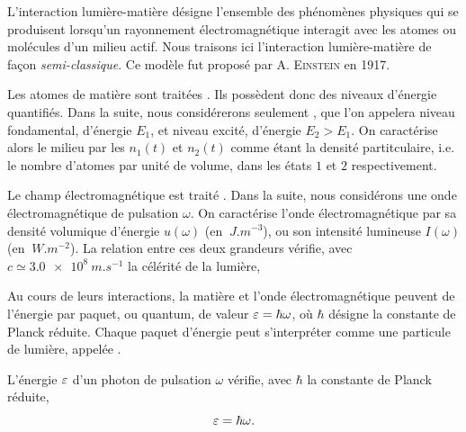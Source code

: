 \documentclass[12pt,fancy]{cours}
\begin{document}
L'interaction lumière-matière désigne l'ensemble des phénomènes physiques qui se produisent lorsqu'un rayonnement électromagnétique interagit avec les atomes ou molécules d'un milieu actif.
Nous traisons ici l'interaction lumière-matière de façon \emph{semi-classique}. Ce modèle fut proposé par A. \textsc{Einstein} en 1917.
\begin{hypotheses}
  \item Les atomes de matière sont traitées . Ils possèdent donc des niveaux d'énergie quantifiés. 
   Dans la suite, nous considérerons seulement , que l'on appelera niveau fondamental, d'énergie $E_1$, et niveau excité, d'énergie $E_2>E_1$. On caractérise alors le milieu par les  $n_1(t)$ et $n_2(t)$ comme étant la densité partitculaire, i.e. le nombre d'atomes par unité de volume, dans les états $1$ et $2$ respectivement. 
  
  \item Le champ électromagnétique est traité . Dans la suite, nous considérons une onde électromagnétique  de pulsation $\omega$. On caractérise l'onde électromagnétique par sa densité volumique d’énergie $u(\omega)$ (en $\SI{}{J.m^{-3}}$), ou son intensité lumineuse $I(\omega)$ (en $\SI{}{W.m^{-2}}$). La relation entre ces deux grandeurs vérifie, avec $c\simeq \SI{3.0e8}{m.s^{-1}}$  la célérité de la lumière,
  
\end{hypotheses}

Au cours de leurs interactions, la matière et l'onde électromagnétique peuvent  de l'énergie par paquet, ou quantum, de valeur $\varepsilon =\hbar\omega$, où $\hbar$ désigne la constante de Planck réduite. Chaque paquet d'énergie peut s'interpréter comme une particule de lumière, appelée .

\begin{theorem}\label{form:PE}
L'énergie $\varepsilon$ d'un photon de pulsation $\omega$ vérifie, avec $\hbar$ la constante de Planck réduite,  
$$\varepsilon =\hbar\omega.$$

\end{theorem}
\end{document}
